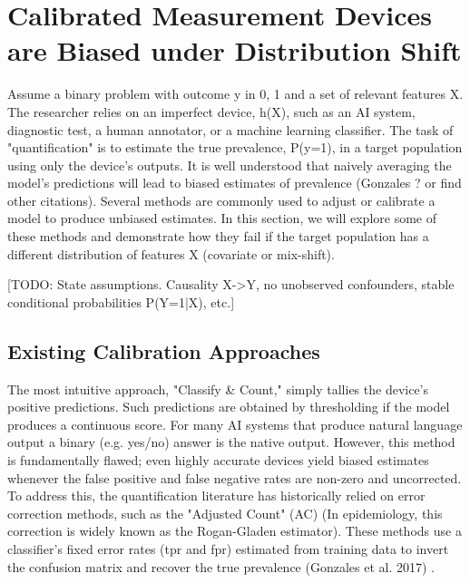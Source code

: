 \documentclass[12pt]{article}
\begin{document}
\section{Calibrated Measurement Devices are Biased under Distribution Shift}

Assume a binary problem with outcome y in {0, 1} and a set of relevant features X. The researcher relies on an imperfect device, h(X), such as an AI system, diagnostic test, a human annotator, or a machine learning classifier. The task of "quantification" is to estimate the true prevalence, P(y=1), in a target population using only the device’s outputs. It is well understood that naively averaging the model’s predictions will lead to biased estimates of prevalence (Gonzales ? or find other citations). Several methods are commonly used to adjust or calibrate a model to produce unbiased estimates. In this section, we will explore some of these methods and demonstrate how they fail if the target population has a different distribution of features X (covariate or mix-shift).

[TODO: State assumptions. Causality X->Y, no unobserved confounders, stable conditional probabilities P(Y=1|X), etc.]

\subsection{Existing Calibration Approaches}

The most intuitive approach, "Classify & Count," simply tallies the device's positive predictions. Such predictions are obtained by thresholding if the model produces a continuous score. For many AI systems that produce natural language output a binary (e.g. yes/no) answer is the native output. However, this method is fundamentally flawed; even highly accurate devices yield biased estimates whenever the false positive and false negative rates are non-zero and uncorrected. To address this, the quantification literature has historically relied on error correction methods, such as the "Adjusted Count" (AC) (In epidemiology, this correction is widely known as the Rogan-Gladen estimator). These methods use a classifier's fixed error rates (tpr and fpr) estimated from training data to invert the confusion matrix and recover the true prevalence (Gonzales et al. 2017)
\citep{gonzalez2017review}.%
\end{document}
